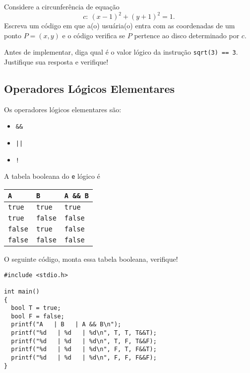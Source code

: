 \documentclass[12pt]{article}
\begin{document}
\begin{exr}
  Considere a circunferência de equação
  \begin{equation}
    c: ~(x - 1)^2 + (y + 1)^2 = 1.
  \end{equation}
  Escreva um código em que a(o) usuária(o) entra com as coordenadas de um ponto $P = (x, y)$ e o código verifica se $P$ pertence ao disco determinado por $c$.
\end{exr}

\begin{exr}
  Antes de implementar, diga qual é o valor lógico da instrução \lstinline+sqrt(3) == 3+. Justifique sua resposta e verifique!
\end{exr}

\subsection{Operadores Lógicos Elementares}

Os operadores lógicos elementares são:
\begin{itemize}
\item[] {\lstinline+&&+} 
\item[] {\lstinline+||+} 
\item[] {\lstinline+!+} 
\end{itemize}

\begin{ex}
  A tabela booleana{\boole} do \lstinline!e! lógico é
  \begin{center}
    \begin{tabular}[H]{ll|l}
      {\lstinline+A+} & {\lstinline+B+} &  {\lstinline+A && B+}\\\hline
      {\lstinline+true+} & {\lstinline+true+} & {\lstinline+true+} \\
      {\lstinline+true+} & {\lstinline+false+} & {\lstinline+false+} \\
      {\lstinline+false+} & {\lstinline+true+} & {\lstinline+false+} \\
      {\lstinline+false+} & {\lstinline+false+} & {\lstinline+false+} \\\hline
    \end{tabular}
  \end{center}

  O seguinte código, monta essa tabela booleana, verifique!
\begin{lstlisting}
#include <stdio.h>

int main()
{
  bool T = true;
  bool F = false;
  printf("A   | B   | A && B\n");
  printf("%d   | %d   | %d\n", T, T, T&&T);
  printf("%d   | %d   | %d\n", T, F, T&&F);
  printf("%d   | %d   | %d\n", F, T, F&&T);
  printf("%d   | %d   | %d\n", F, F, F&&F);
}
\end{lstlisting}
\end{ex}
\end{document}
